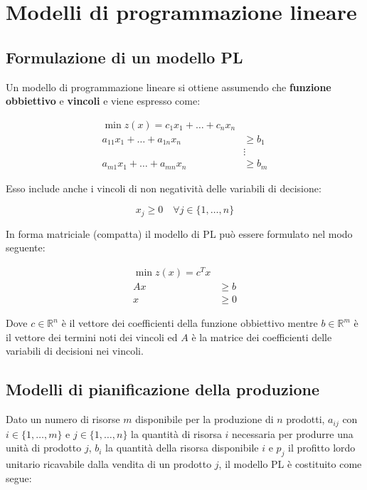 \documentclass[\main/main.tex]{subfiles}
\begin{document}
\chapter{Modelli di programmazione lineare}

\section{Formulazione di un modello PL}
Un modello di programmazione lineare si ottiene assumendo che \textbf{funzione obbiettivo} e \textbf{vincoli} e viene espresso come:

\begin{align*}
	\min z(x) = c_1x_1 + \ldots + c_nx_n       \\
	a_{11}x_1 +  \ldots + a_{1n}x_n & \geq b_1 \\
	                                & \vdots   \\
	a_{m1}x_1 +  \ldots + a_{mn}x_n & \geq b_m
\end{align*}

Esso include anche i vincoli di non negatività delle variabili di decisione:

\[
	x_j \geq 0 \quad \forall j \in \{1,\ldots,n\}
\]

In forma matriciale (compatta) il modello di PL può essere formulato nel modo seguente:

\begin{align*}
	\min z(x) = c^Tx \\
	Ax & \geq b      \\
	x  & \geq 0
\end{align*}

Dove $c \in \mathbb{R}^n$ è il vettore dei coefficienti della funzione obbiettivo mentre $b \in \mathbb{R}^m$ è il vettore dei termini noti dei vincoli ed $A$ è la matrice dei coefficienti delle variabili di decisioni nei vincoli.

\section{Modelli di pianificazione della produzione}
Dato un numero di risorse $m$ disponibile per la produzione di $n$ prodotti, $a_{ij}$ con $i \in \{1,\ldots,m\}$ e $j \in \{1,\ldots,n\}$ la quantità di risorsa $i$ necessaria per produrre una unità di prodotto $j$, $b_i$ la quantità della risorsa disponibile $i$ e $p_j$ il profitto lordo unitario ricavabile dalla vendita di un prodotto $j$, il modello PL è costituito come segue:
\end{document}
